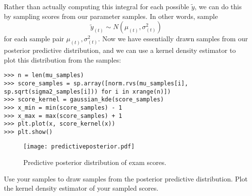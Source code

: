 Rather than actually computing this integral for each possible $\tilde{y}$, we can do this by sampling scores from our parameter samples. In other words, sample 
\begin{equation*}
\tilde{y}_{(t)} \sim N(\mu_{(t)}, \sigma_{(t)}^{2})
\end{equation*}
for each sample pair $\mu_{(t)}, \sigma_{(t)}^{2}$. Now we have essentially drawn samples from our posterior predictive distribution, and we can use a kernel density estimator to plot this distribution from the samples:
\begin{lstlisting}
>>> n = len(mu_samples)
>>> score_samples = sp.array([norm.rvs(mu_samples[i], sp.sqrt(sigma2_samples[i])) for i in xrange(n)])
>>> score_kernel = gaussian_kde(score_samples)
>>> x_min = min(score_samples) - 1
>>> x_max = max(score_samples) + 1
>>> plt.plot(x, score_kernel(x))
>>> plt.show()
\end{lstlisting}

\begin{figure}[h]
\centering
\texttt{[image: predictiveposterior.pdf]}
\caption{Predictive posterior distribution of exam scores.}
\end{figure}

\begin{problem}
Use your samples to draw samples from the posterior predictive distribution. Plot the kernel density estimator of your sampled scores.
\end{problem}